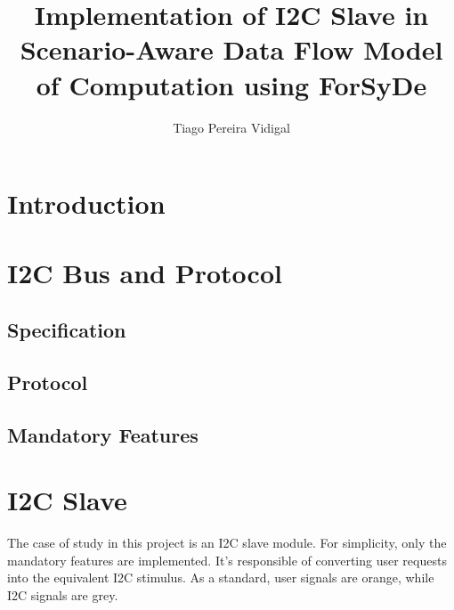 \documentclass{article}
\begin{document}

\title{Implementation of I2C Slave in Scenario-Aware Data Flow Model of Computation using ForSyDe}
\author{Tiago Pereira Vidigal}
\maketitle


\section{Introduction} \label{sec:intro}


\section{I2C Bus and Protocol} \label{sec:proto}
\subsection{Specification}
\subsection{Protocol}
\subsection{Mandatory Features}


\section{I2C Slave} \label{sec:slave}
The case of study in this project is an I2C slave module. For simplicity, only the mandatory features are implemented. It's responsible of converting user requests into the equivalent I2C stimulus. As a standard, user signals are orange, while I2C signals are grey.
\end{document}
